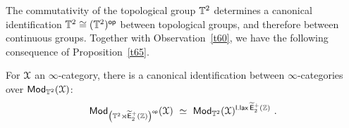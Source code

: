The commutativity of the topological group $\mathbb T^2$ determines a canonical identification $\mathbb T^2 \cong (\mathbb T^2)^{\operatorname{\mathsf{op}}}$ between topological groups, and therefore between continuous groups.
Together with Observation~\ref{t60}, we have the following consequence of Proposition~\ref{t65}.
\begin{cor}
\label{f6}
For $\mathcal X$ an $\infty$-category, there is a canonical identification between $\infty$-categories over $\operatorname{\sf Mod}_{\mathbb T^2}(\mathcal X)$:
\[
\operatorname{\sf Mod}_{\left(\mathbb T^2 \rtimes \operatorname{\widetilde{\sf E}_{2}^{+}(\mathbb Z)} \right)^{\operatorname{\mathsf{op}}}}(\mathcal X)
~\simeq~
\operatorname{\sf Mod}_{\mathbb T^2}(\mathcal X)^{{\sf l.lax} \operatorname{\widetilde{\sf E}_{2}^{+}(\mathbb Z)}}
~.
\]

\end{cor}











